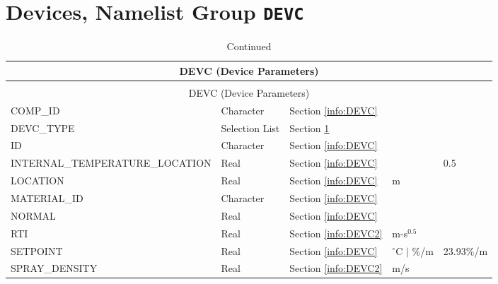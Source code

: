 \clearpage
\section{Devices, Namelist Group \texorpdfstring{{\tt DEVC}}{DEVC}}

\label{info:DEVC3}
\begin{longtable}{@{\extracolsep{\fill}}|l|l|l|l|l|}
\caption[Device Parameters ({\ct DEVC} namelist group)]{For more information see Section~\ref{info:DEVC}.}
\label{tbl:DEVC} \\
\hline
\multicolumn{5}{|c|}{{\ct DEVC} (Device Parameters)} \\
\hline \hline
\endfirsthead
\caption[]{Continued} \\
\hline
\multicolumn{5}{|c|}{{\ct DEVC} (Device Parameters)} \\
\hline \hline
\endhead
{\ct COMP\_ID}            & Character   & Section \ref{info:DEVC}     &                   &                 \\ \hline
{\ct DEVC\_TYPE}      & Selection List   & Section \ref{info:DEVC3}     &                   &                 \\ \hline
{\ct ID}      		      & Character   & Section \ref{info:DEVC}                 &                   &                 \\ \hline
{\ct INTERNAL\_TEMPERATURE\_LOCATION}     & Real        & Section \ref{info:DEVC}     &                   &       0.5       \\ \hline
{\ct LOCATION}       & Real        & Section \ref{info:DEVC}                 & m                 &                 \\ \hline
{\ct MATERIAL\_ID}            & Character   & Section \ref{info:DEVC}                 &                   &                 \\ \hline
{\ct NORMAL}         & Real        & Section \ref{info:DEVC}                 &                   &                 \\ \hline
{\ct RTI}                 & Real        & Section \ref{info:DEVC2}                 & m-s$^{0.5}$       &                 \\ \hline
{\ct SETPOINT}            & Real        & Section \ref{info:DEVC}     & $^\circ$C $\mid$ \%/m  &     23.93\%/m      \\ \hline
{\ct SPRAY\_DENSITY}      & Real        & Section \ref{info:DEVC2}     & m/s               &                 \\ \hline
\end{longtable}

